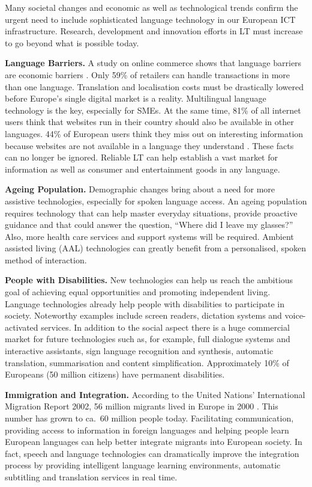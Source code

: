 \documentclass[10pt, plain]{../../metanetpaper}
\begin{document}
\begin{multicols}{2}
Many societal changes and economic as well as technological trends confirm the urgent need to include sophisticated language technology in our European ICT infrastructure. Research, development and innovation efforts in LT must increase to go beyond what is possible today.

\textbf{Language Barriers.} A study on online commerce shows that language barriers are economic barriers \cite{EC4}. Only 59\% of retailers can handle transactions in more than one language. Translation and localisation costs must be drastically lowered before Europe’s single digital market is a reality. Multilingual language technology is the key, especially for SMEs. At the same time, 81\% of all internet users think that websites run in their country should also be available in other languages. 44\% of European users think they miss out on interesting information because websites are not available in a language they understand \cite{EC1}. These facts can no longer be ignored. Reliable LT can help establish a vast market for information as well as consumer and entertainment goods in any language.

\textbf{Ageing Population.} Demographic changes bring about a need for more assistive technologies, especially for spoken language access. An ageing population requires technology that can help master everyday situations, provide proactive guidance and that could answer the question, “Where did I leave my glasses?” Also, more health care services and support systems will be required. Ambient assisted living (AAL) technologies can greatly benefit from a personalised, spoken method of interaction.

\textbf{People with Disabilities.} New technologies can help us reach the ambitious goal of achieving equal opportunities and promoting independent living. Language technologies already help people with disabilities to participate in society. Noteworthy examples include screen readers, dictation systems and voice-activated services. In addition to the social aspect there is a huge commercial market for future technologies such as, for example, full dialogue systems and interactive assistants, sign language recognition and synthesis, automatic translation, summarisation and content simplification. Approximately 10\% of Europeans (50 million citizens) have permanent disabilities.

\textbf{Immigration and Integration.} According to the United Nations' International Migration Report 2002, 56 million migrants lived in Europe in 2000 \cite{UN1}. This number has grown to ca.~60 million people today. Facilitating communication, providing access to information in foreign languages and helping people learn European languages can help better integrate migrants into European society. In fact, speech and language technologies can dramatically improve the integration process by providing intelligent language learning environments, automatic subtitling and translation services in real time.


\end{multicols}
\end{document}
